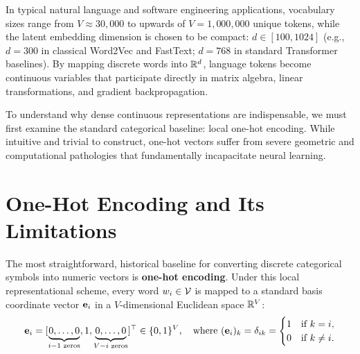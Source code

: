 \documentclass[../../main.tex]{subfiles}
\begin{document}
In typical natural language and software engineering applications, vocabulary sizes range from $V \approx 30{,}000$ to upwards of $V = 1{,}000{,}000$ unique tokens, while the latent embedding dimension is chosen to be compact: $d \in [100, 1024]$ (e.g., $d = 300$ in classical Word2Vec and FastText; $d = 768$ in standard Transformer baselines). By mapping discrete words into $\mathbb{R}^d$, language tokens become continuous variables that participate directly in matrix algebra, linear transformations, and gradient backpropagation.

To understand why dense continuous representations are indispensable, we must first examine the standard categorical baseline: local one-hot encoding. While intuitive and trivial to construct, one-hot vectors suffer from severe geometric and computational pathologies that fundamentally incapacitate neural learning.

\clearpage

\clearpage
\section{One-Hot Encoding and Its Limitations}
\label{sec:onehot_baseline}

The most straightforward, historical baseline for converting discrete categorical symbols into numeric vectors is \textbf{one-hot encoding}. Under this local representational scheme, every word $w_i \in \mathcal{V}$ is mapped to a standard basis coordinate vector $\mathbf{e}_i$ in a $V$-dimensional Euclidean space $\mathbb{R}^V$:
\begin{equation}
\label{eq:onehot_def}
\mathbf{e}_i = [\underbrace{0, \dots, 0}_{i-1\text{ zeros}}, 1, \underbrace{0, \dots, 0}_{V-i\text{ zeros}}]^\top \in \{0, 1\}^V, \quad \text{where } (\mathbf{e}_i)_k = \delta_{ik} = \begin{cases} 1 & \text{if } k = i, \\ 0 & \text{if } k \neq i. \end{cases}
\end{equation}
\end{document}
